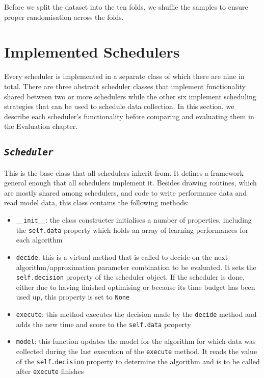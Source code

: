 \documentclass[a4paper,12pt,twoside,openright]{report}
\begin{document}

Before we split the dataset into the ten folds, we shuffle the samples to ensure proper randomisation across the folds. 













\section{Implemented Schedulers}
Every scheduler is implemented in a separate class of which there are nine in total. There are three abstract scheduler classes that implement functionality shared between two or more schedulers while the other six implement scheduling strategies that can be used to schedule data collection. In this section, we describe each scheduler's functionality before comparing and evaluating them in the Evaluation chapter.

\subsection{\texttt{\textit{Scheduler}}}
This is the base class that all schedulers inherit from. It defines a framework general enough that all schedulers implement it. Besides drawing routines, which are mostly shared among schedulers, and code to write performance data and read model data, this class contains the following methods:

\begin{itemize}
\item \texttt{\_\_init\_\_}: the class constructer initialises a number of properties, including the \texttt{self.data} property which holds an array of learning performances for each algorithm
\item \texttt{decide}: this is a virtual method that is called to decide on the next algorithm/approximation parameter combination to be evaluated. It sets the \texttt{self.decision} property of the scheduler object. If the scheduler is done, either due to having finished optimising or because its time budget has been used up, this property is set to \texttt{None}
\item \texttt{execute}: this method executes the decision made by the \texttt{decide} method and adds the new time and score to the \texttt{self.data} property
\item \texttt{model}: this function updates the model for the algorithm for which data was collected during the last execution of the \texttt{execute} method. It reads the value of the \texttt{self.decision} property to determine the algorithm and is to be called after \texttt{execute} finishes
\end{itemize}
\end{document}
